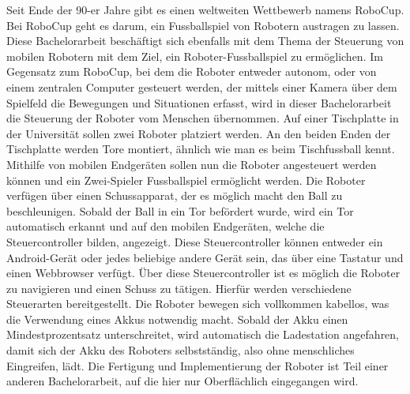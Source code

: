 Seit Ende der 90-er Jahre gibt es einen weltweiten Wettbewerb namens RoboCup. Bei RoboCup geht es darum, ein Fussballspiel von Robotern austragen zu lassen. Diese Bachelorarbeit beschäftigt sich ebenfalls mit dem Thema der Steuerung von mobilen Robotern mit dem Ziel, ein Roboter-Fussballspiel zu ermöglichen. Im Gegensatz zum RoboCup, bei dem die Roboter entweder autonom, oder von einem zentralen Computer gesteuert werden, der mittels einer Kamera über dem Spielfeld die Bewegungen und Situationen erfasst, wird in dieser Bachelorarbeit die Steuerung der Roboter vom Menschen übernommen. Auf einer Tischplatte in der Universität sollen zwei Roboter platziert werden. An den beiden Enden der Tischplatte werden Tore montiert, ähnlich wie man es beim Tischfussball kennt. Mithilfe von mobilen Endgeräten sollen nun die Roboter angesteuert werden können und ein Zwei-Spieler Fussballspiel ermöglicht werden. Die Roboter verfügen über einen Schussapparat, der es möglich macht den Ball zu beschleunigen. Sobald der Ball in ein Tor befördert wurde, wird ein Tor automatisch erkannt und auf den mobilen Endgeräten, welche die Steuercontroller bilden, angezeigt. Diese Steuercontroller können entweder ein Android-Gerät oder jedes beliebige andere Gerät sein, das über eine Tastatur und einen Webbrowser verfügt. Über diese Steuercontroller ist es möglich die Roboter zu navigieren und einen Schuss zu tätigen. Hierfür werden verschiedene Steuerarten bereitgestellt. 
Die Roboter bewegen sich vollkommen kabellos, was die Verwendung eines Akkus notwendig macht. Sobald der Akku einen Mindestprozentsatz unterschreitet, wird automatisch die Ladestation angefahren, damit sich der Akku des Roboters selbstständig, also ohne menschliches Eingreifen, lädt.
Die Fertigung und Implementierung der Roboter ist Teil einer anderen Bachelorarbeit, auf die hier nur Oberflächlich eingegangen wird.               





